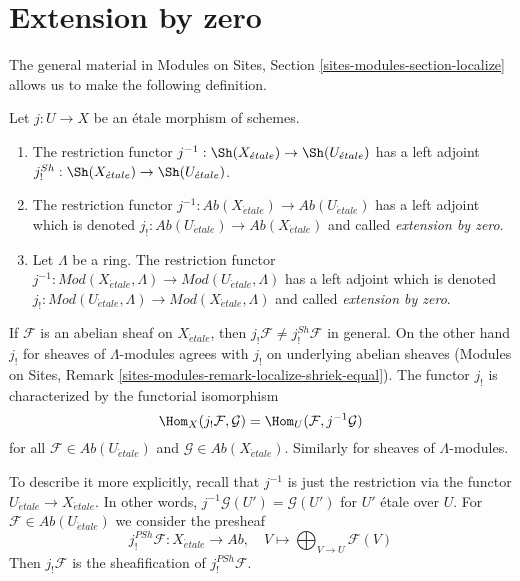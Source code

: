 \section{Extension by zero}
\label{section-extension-by-zero}

\noindent
The general material in
Modules on Sites, Section \ref{sites-modules-section-localize}
allows us to make the following definition.

\begin{definition}
\label{definition-extension-zero}
Let $j : U \to X$ be an \'etale morphism of schemes.
\begin{enumerate}
\item The restriction functor
$j^{-1} : \Sh(X_{\acute{e}tale}) \to \Sh(U_{\acute{e}tale})$
has a left adjoint
$j_!^{Sh} : \Sh(X_{\acute{e}tale}) \to \Sh(U_{\acute{e}tale})$.
\item The restriction functor
$j^{-1} : \textit{Ab}(X_{\acute{e}tale}) \to \textit{Ab}(U_{\acute{e}tale})$
has a left adjoint which is denoted
$j_! : \textit{Ab}(U_{\acute{e}tale}) \to \textit{Ab}(X_{\acute{e}tale})$
and called {\it extension by zero}.
\item Let $\Lambda$ be a ring. The restriction functor
$j^{-1} : \textit{Mod}(X_{\acute{e}tale}, \Lambda) \to
\textit{Mod}(U_{\acute{e}tale}, \Lambda)$
has a left adjoint which is denoted
$j_! : \textit{Mod}(U_{\acute{e}tale}, \Lambda) \to
\textit{Mod}(X_{\acute{e}tale}, \Lambda)$
and called {\it extension by zero}.
\end{enumerate}
\end{definition}

\noindent
If $\mathcal{F}$ is an abelian sheaf on $X_{\acute{e}tale}$, then
$j_!\mathcal{F} \not = j_!^{Sh}\mathcal{F}$ in general. On the other hand
$j_!$ for sheaves of $\Lambda$-modules agrees with $j_!$ on underlying
abelian sheaves
(Modules on Sites, Remark \ref{sites-modules-remark-localize-shriek-equal}).
The functor $j_!$ is characterized by the functorial isomorphism
$$
\Hom_X(j_!\mathcal{F}, \mathcal{G}) = \Hom_U(\mathcal{F}, j^{-1}\mathcal{G})
$$
for all $\mathcal{F} \in \textit{Ab}(U_{\acute{e}tale})$ and
$\mathcal{G} \in \textit{Ab}(X_{\acute{e}tale})$. Similarly for
sheaves of $\Lambda$-modules.

\medskip\noindent
To describe it more explicitly, recall that $j^{-1}$ is just the restriction
via the functor $U_{\acute{e}tale} \to X_{\acute{e}tale}$. In other words,
$j^{-1}\mathcal{G}(U') = \mathcal{G}(U')$ for $U'$ \'etale over $U$.
For $\mathcal{F} \in \textit{Ab}(U_{\acute{e}tale})$
we consider the presheaf
$$
j_!^{PSh}\mathcal{F} : X_{\acute{e}tale} \longrightarrow \textit{Ab},
\quad
V \longmapsto \bigoplus\nolimits_{V \to U} \mathcal{F}(V)
$$
Then $j_!\mathcal{F}$ is the sheafification of $j_!^{PSh}\mathcal{F}$.

